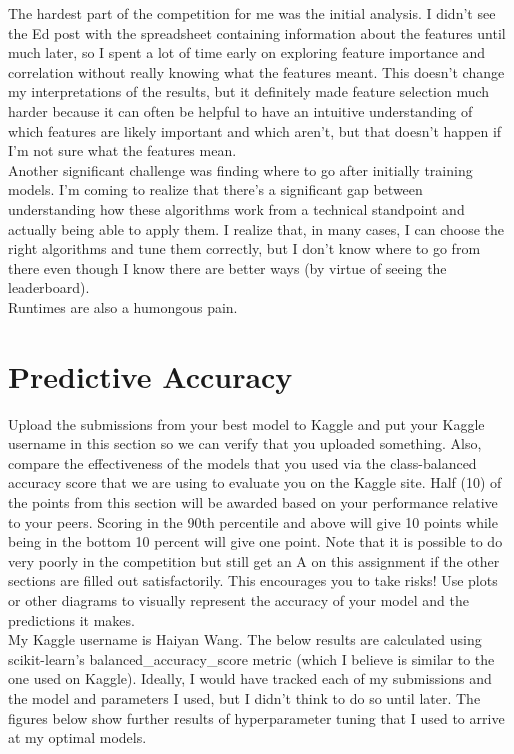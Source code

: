 \documentclass[12pt]{article}
\newtheorem{Proof of Lemma}{Proof of Lemma}
\begin{document}
The hardest part of the competition for me was the initial analysis. I didn't see the Ed post with the spreadsheet containing information about the features until much later, so I spent a lot of time early on exploring feature importance and correlation without really knowing what the features meant. This doesn't change my interpretations of the results, but it definitely made feature selection much harder because it can often be helpful to have an intuitive understanding of which features are likely important and which aren't, but that doesn't happen if I'm not sure what the features mean. \\

Another significant challenge was finding where to go after initially training models. I'm coming to realize that there's a significant gap between understanding how these algorithms work from a technical standpoint and actually being able to apply them. I realize that, in many cases, I can choose the right algorithms and tune them correctly, but I don't know where to go from there even though I know there are better ways (by virtue of seeing the leaderboard). \\

Runtimes are also a humongous pain.

\section{Predictive Accuracy}
Upload the submissions from your best model to Kaggle and put your Kaggle username in this section so we can verify that you uploaded something. Also, compare the effectiveness of the models that you used via the class-balanced accuracy score that we are using to evaluate you on the Kaggle site. Half (10) of the points from this section will be awarded based on your performance relative to your peers. Scoring in the 90th percentile and above will give 10 points while being in the bottom 10 percent will give one point. Note that it is possible to do very poorly in the competition but still get an A on this assignment if the other sections are filled out satisfactorily. This encourages you to take risks! Use plots or other diagrams to visually represent the accuracy of your model and the predictions it makes. \\

My Kaggle username is Haiyan Wang. The below results are calculated using scikit-learn's balanced\_accuracy\_score metric (which I believe is similar to the one used on Kaggle). Ideally, I would have tracked each of my submissions and the model and parameters I used, but I didn't think to do so until later. The figures below show further results of hyperparameter tuning that I used to arrive at my optimal models.
\end{document}
